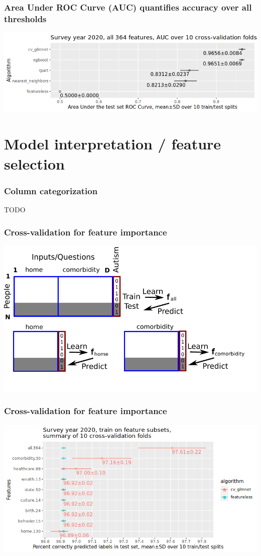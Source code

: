 \documentclass{beamer}
\begin{document}
\begin{frame}
  \frametitle{Area Under ROC Curve (AUC) quantifies accuracy over all thresholds}
  \includegraphics[width=\textwidth]{download-nsch-mlr3batchmark-registry-one-set-all-features-auc.png}
\end{frame}

\section{Model interpretation / feature selection}

\begin{frame}
  \frametitle{Column categorization}
  TODO
\end{frame}

\begin{frame}
  \frametitle{Cross-validation for feature importance}
  \includegraphics[width=\textwidth]{drawing-cv-feature-sets.pdf}
\end{frame}

\begin{frame}
  \frametitle{Cross-validation for feature importance}
  \includegraphics[width=\textwidth]{download-nsch-mlr3batchmark-registry-one-set-compare-features.png}
\end{frame}
\end{document}
